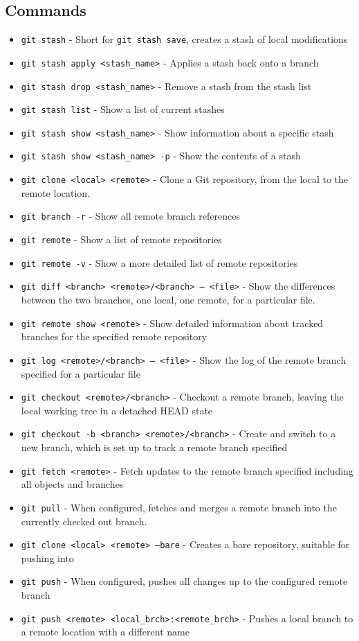 \subsection{Commands}
\begin{itemize}
\item\texttt{git stash} - Short for \texttt{git stash save}, creates a stash of local modifications
\item\texttt{git stash apply <stash\_name>} - Applies a stash back onto a branch
\item\texttt{git stash drop <stash\_name>} - Remove a stash from the stash list
\item\texttt{git stash list} - Show a list of current stashes
\item\texttt{git stash show <stash\_name>} - Show information about a specific stash
\item\texttt{git stash show <stash\_name> -p} - Show the contents of a stash
\item\texttt{git clone <local> <remote>} - Clone a Git repository, from the local to the remote location.
\item\texttt{git branch -r} - Show all remote branch references
\item\texttt{git remote} - Show a list of remote repositories
\item\texttt{git remote -v} - Show a more detailed list of remote repositories
\item\texttt{git diff <branch> <remote>/<branch> -- <file>} - Show the differences between the two branches, one local, one remote, for a particular file.
\item\texttt{git remote show <remote>} - Show detailed information about tracked branches for the specified remote repository
\item\texttt{git log <remote>/<branch> -- <file>} - Show the log of the remote branch specified for a particular file
\item\texttt{git checkout <remote>/<branch>} - Checkout a remote branch, leaving the local working tree in a detached HEAD state
\item\texttt{git checkout -b <branch> <remote>/<branch>} - Create and switch to a new branch, which is set up to track a remote branch specified
\item\texttt{git fetch <remote>} - Fetch updates to the remote branch specified including all objects and branches
\item\texttt{git pull} - When configured, fetches and merges a remote branch into the currently checked out branch.
\item\texttt{git clone <local> <remote> --bare} - Creates a bare repository, suitable for pushing into
\item\texttt{git push} - When configured, pushes all changes up to the configured remote branch
\item\texttt{git push <remote> <local\_brch>:<remote\_brch>} - Pushes a local branch to a remote location with a different name
\end{itemize}

